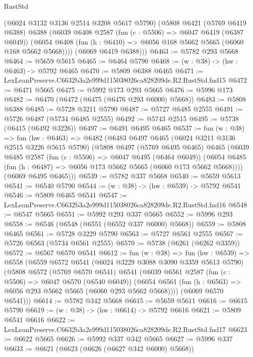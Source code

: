 \begin{lexlean}{RustStd}
\begin{coremodule}
      (@6024 @3132 @3136 @2514 @3208 @5617 @5790)
      (@5808
        @6421
        (@5769 @6419 @6388)
        @6388
        (@6039
          @6408
          @2587
          (fun (c : @5506) => @6047 @6419 (@6387 @6049))
          (@6054 @6408 (fun (h : @6410) => @6056 @168 @5662 @5665 (@6060 @168 @5662 @5668))))
        (@6069 @6419 @6388)))
@6463 := @5782 @293 @5668
@6464 := @5659 @5615
@6465 := @6464 @5790
@6468 := (w : @38) -> (hw : @6463) -> @5792 @6465
@6470 := @5809 @6388 @6465
@6471 := LexLeanPreserve.C6632b3a2e999d115038026ca828209de.R2.RustStd.fnd15
@6472 := @6471 @5665
@6475 := @5992 @173 @293 @5665
@6476 := @5996 @173
@6482 := @6470 (@6472 (@6475 (@6476 @293 @6000) @5668))
@6483 := @5808 @6388
@6485 := @5728 @3211 @5790
@6487 := @5727 @6485 @2555
@6491 := @5726 @6487 (@5734 @6485 @2555)
@6492 := @5743 @2515
@6495 := @5738 (@6415 (@6492 @3226))
@6497 := @6491 @6495 @6465
@6537 := fun (w : @38) =>
  fun (hw : @6463) =>
  @6482
    (@6483
      @6497
      @6465
      (@6024 @3211 @3136 @2515 @3226 @5615 @5790)
      (@5808
        @6497
        (@5769 @6495 @6465)
        @6465
        (@6039
          @6485
          @2587
          (fun (c : @5506) => @6047 @6495 (@6464 @6049))
          (@6054 @6485 (fun (h : @6487) => @6056 @173 @5662 @5665 (@6060 @173 @5662 @5668))))
        (@6069 @6495 @6465)))
@6539 := @5782 @337 @5668
@6540 := @5659 @5613
@6541 := @6540 @5790
@6544 := (w : @38) -> (hw : @6539) -> @5792 @6541
@6546 := @5809 @6465 @6541
@6547 := LexLeanPreserve.C6632b3a2e999d115038026ca828209de.R2.RustStd.fnd16
@6548 := @6547 @5665
@6551 := @5992 @293 @337 @5665
@6552 := @5996 @293
@6558 := @6546 (@6548 (@6551 (@6552 @337 @6000) @5668))
@6559 := @5808 @6465
@6561 := @5728 @3229 @5790
@6563 := @5727 @6561 @2555
@6567 := @5726 @6563 (@5734 @6561 @2555)
@6570 := @5738 (@6261 (@6262 @3359))
@6572 := @6567 @6570 @6541
@6612 := fun (w : @38) =>
  fun (hw : @6539) =>
  @6558
    (@6559
      @6572
      @6541
      (@6024 @3229 @3088 @3090 @3359 @5613 @5790)
      (@5808
        @6572
        (@5769 @6570 @6541)
        @6541
        (@6039
          @6561
          @2587
          (fun (c : @5506) => @6047 @6570 (@6540 @6049))
          (@6054 @6561 (fun (h : @6563) => @6056 @293 @5662 @5665 (@6060 @293 @5662 @5668))))
        (@6069 @6570 @6541)))
@6614 := @5782 @342 @5668
@6615 := @5659 @5611
@6616 := @6615 @5790
@6619 := (w : @38) -> (hw : @6614) -> @5792 @6616
@6621 := @5809 @6541 @6616
@6622 := LexLeanPreserve.C6632b3a2e999d115038026ca828209de.R2.RustStd.fnd17
@6623 := @6622 @5665
@6626 := @5992 @337 @342 @5665
@6627 := @5996 @337
@6633 := @6621 (@6623 (@6626 (@6627 @342 @6000) @5668))

\end{coremodule}
\end{lexlean}
